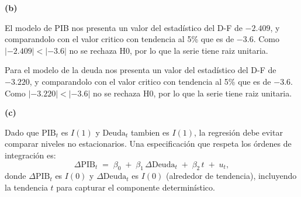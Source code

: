 \documentclass[10pt,a4paper]{article}
\begin{document}
\begin{enumerate}
\medskip
\textbf{(b) }

El modelo de PIB nos presenta un valor del estadístico del D-F de $-2.409$, y comparandolo con el valor critico con tendencia al 5\% que es de $-3.6$. Como $|-2.409|<|-3.6|$ no se rechaza H0, por lo que la serie tiene raiz unitaria.

Para el modelo de la deuda nos presenta un valor del estadístico del D-F de $-3.220$, y comparandolo con el valor critico con tendencia al 5\% que es de $-3.6$. Como $|-3.220|<|-3.6|$ no se rechaza H0, por lo que la serie tiene raiz unitaria.


\medskip
\textbf{(c) }

Dado que \(\text{PIB}_t\) es \(I(1)\) y \(\text{Deuda}_t\) tambien es  \(I(1)\), la regresión debe evitar comparar niveles no estacionarios. Una especificación que respeta los órdenes de integración es:
\[
\Delta \text{PIB}_t \;=\; \beta_0 \;+\; \beta_1\,  \Delta \text{Deuda}_t \;+\; \beta_2\, t \;+\; u_t,
\]
donde \(\Delta \text{PIB}_t\) es \(I(0)\) y \(\Delta \text{Deuda}_t\) es \(I(0)\) (alrededor de tendencia), incluyendo la tendencia \(t\) para capturar el componente determinístico. 

\end{enumerate}

\newpage
\end{document}
